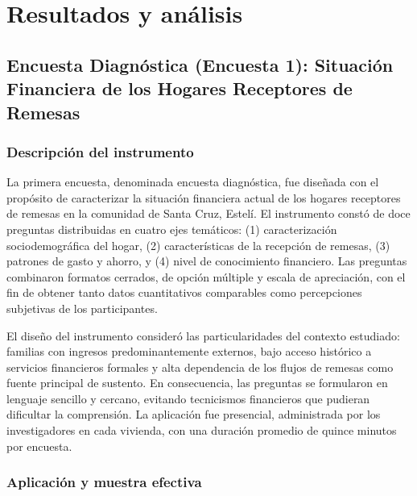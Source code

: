 \documentclass[12pt,letterpaper]{article}
\begin{document}
\newpage
\section{\texorpdfstring{\textbf{Resultados y análisis}}{Resultados y análisis}}\label{capuxedtulo-iv-resultados-y-anuxe1lisis}

\subsection{\texorpdfstring{\textbf{Encuesta Diagnóstica (Encuesta 1): Situación Financiera de los Hogares Receptores de Remesas}}{Encuesta Diagnóstica (Encuesta 1): Situación Financiera de los Hogares Receptores de Remesas}}\label{encuesta-diagnuxf3stica-encuesta-1-situaciuxf3n-financiera-de-los-hogares-receptores-de-remesas}

\subsubsection{\texorpdfstring{\textbf{Descripción del instrumento}}{Descripción del instrumento}}\label{descripciuxf3n-del-instrumento}

La primera encuesta, denominada encuesta diagnóstica, fue diseñada con el propósito de caracterizar la situación financiera actual de los hogares receptores de remesas en la comunidad de Santa Cruz, Estelí. El instrumento constó de doce preguntas distribuidas en cuatro ejes temáticos: (1) caracterización sociodemográfica del hogar, (2) características de la recepción de remesas, (3) patrones de gasto y ahorro, y (4) nivel de conocimiento financiero. Las preguntas combinaron formatos cerrados, de opción múltiple y escala de apreciación, con el fin de obtener tanto datos cuantitativos comparables como percepciones subjetivas de los participantes.

El diseño del instrumento consideró las particularidades del contexto estudiado: familias con ingresos predominantemente externos, bajo acceso histórico a servicios financieros formales y alta dependencia de los flujos de remesas como fuente principal de sustento. En consecuencia, las preguntas se formularon en lenguaje sencillo y cercano, evitando tecnicismos financieros que pudieran dificultar la comprensión. La aplicación fue presencial, administrada por los investigadores en cada vivienda, con una duración promedio de quince minutos por encuesta.

\subsubsection{\texorpdfstring{\textbf{Aplicación y muestra efectiva}}{Aplicación y muestra efectiva}}\label{aplicaciuxf3n-y-muestra-efectiva}
\end{document}
